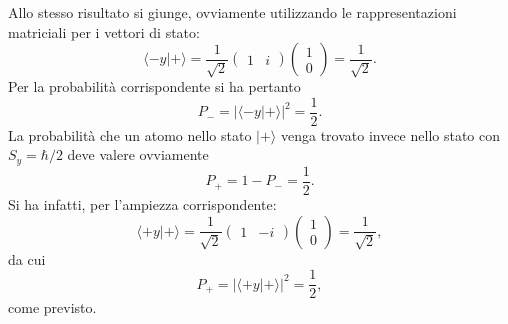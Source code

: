\documentclass[a4paper,12pt,oneside]{book}
\begin{document}
Allo stesso risultato si giunge, ovviamente utilizzando le rappresentazioni matriciali per i vettori di stato:
	\begin{equation}
		\langle -y | + \rangle= \frac{1}{\sqrt{2}}
		\begin{pmatrix}
		1 & i
		\end{pmatrix}
		\begin{pmatrix}
		1 \\
		0
		\end{pmatrix}=
		\frac{1}{\sqrt{2}} .
	\end{equation}
Per la probabilità corrispondente si ha pertanto
	\begin{equation}
		\boxed{
			P_-= |\langle -y | + \rangle |^2=\frac{1}{2} .
			}
	\end{equation}
La probabilità che un atomo nello stato $| + \rangle $  venga trovato invece nello stato con $S_y=\hbar/2$ deve valere ovviamente
	\begin{equation}
		\boxed{
			P_+= 1-P_-=\frac{1}{2} .
			}
	\end{equation}
Si ha infatti, per l'ampiezza corrispondente:
	\begin{equation}
		\langle +y | + \rangle = \frac{1}{\sqrt{2}}
		\begin{pmatrix}
		1 & -i
		\end{pmatrix}
		\begin{pmatrix}
		1 \\
		0
		\end{pmatrix}=
		\frac{1}{\sqrt{2}} ,
	\end{equation}
da cui
	\begin{equation}
		P_+= |\langle +y | + \rangle |^2=\frac{1}{2} ,
		\end{equation}
come previsto.
\end{document}
